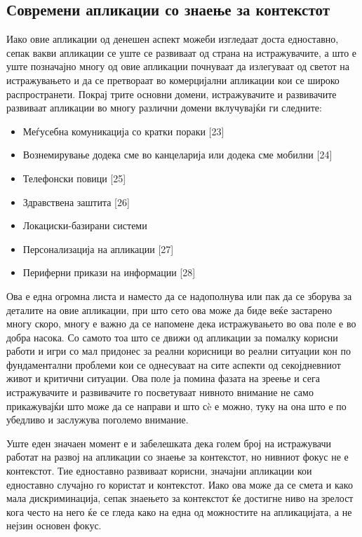\subsection{Современи апликации со знаење за контекстот}

Иако овие апликации од денешен аспект можеби изгледаат доста едноставно, сепак
вакви апликации се уште се развиваат од страна на истражувачите, а што е уште
позначајно многу од овие апликации почнуваат да излегуваат од светот на
истражувањето и да се претвораат во комерцијални апликации кои се широко
распространети. Покрај трите основни домени, истражувачите и развивачите
развиваат апликации во многу различни домени вклучувајќи ги следните:

\begin{itemize}
  \item Меѓусебна комуникација со кратки пораки [23]
  \item Вознемирување додека сме во канцеларија или додека сме мобилни [24]
  \item Телефонски повици [25]
  \item Здравствена заштита [26]
  \item Локациски-базирани системи
  \item Персонализација на апликации [27]
  \item Периферни прикази на информации [28]
\end{itemize}  

Ова е една огромна листа и наместо да се надополнува или пак да се зборува за
деталите на овие апликации, при што сето ова може да биде веќе застарено многу
скоро, многу е важно да се напомене дека истражувањето во ова поле е во добра
насока. Со самото тоа што се движи од апликации за помалку корисни работи и игри
со мал придонес за реални корисници во реални ситуации кон по фундаментални
проблеми кои се однесуваат на сите аспекти од секојдневниот живот и критични
ситуации. Ова поле ја помина фазата на зреење и сега истражувачите и развивачите
го посветуваат нивното внимание не само прикажувајќи што може да се направи и
што сè е можно, туку на она што е по убедливо и заслужува поголемо внимание.

Уште еден значаен момент е и забелешката дека голем број на истражувачи работат
на развој на апликации со знаење за контекстот, но нивниот фокус не е
контекстот. Тие едноставно развиваат корисни, значајни апликации кои едноставно
случајно го користат и контекстот. Иако ова може да се смета и како мала
дискриминација, сепак знаењето за контекстот ќе достигне ниво на зрелост кога
често на него ќе се гледа како на една од можностите на апликацијата, а не
нејзин основен фокус.

